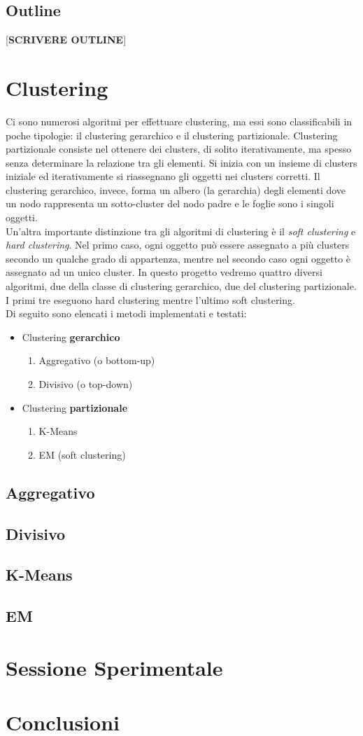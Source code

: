 \documentclass[12pt]{llncs}
\newcommand{\acapo}{\vspace{0.5\baselineskip}\\}
\begin{document}
	\subsection{Outline}
	[\textbf{SCRIVERE OUTLINE}]
	\section{Clustering}
	Ci sono numerosi algoritmi per effettuare clustering, ma essi sono classificabili in poche tipologie: il clustering gerarchico e il clustering partizionale.
	Clustering partizionale consiste nel ottenere dei clusters, di solito iterativamente, ma spesso senza determinare la relazione tra gli elementi. Si inizia con un insieme di clusters iniziale ed iterativamente
	si riassegnano gli oggetti nei clusters corretti. Il clustering gerarchico, invece, forma un albero (la gerarchia) degli elementi dove un nodo rappresenta un sotto-cluster del nodo padre e le foglie sono i singoli
	oggetti.
	\acapo
	Un'altra importante distinzione tra gli algoritmi di clustering è il \textit{soft clustering} e \textit{hard clustering}. Nel primo caso, ogni oggetto può essere assegnato a più clusters secondo un qualche
	grado di appartenza, mentre nel secondo caso ogni oggetto è assegnato ad un unico cluster. In questo progetto vedremo quattro diversi algoritmi, due della classe di clustering gerarchico, due del clustering partizionale.
	I primi tre eseguono hard clustering mentre l'ultimo soft clustering.
	\acapo
	Di seguito sono elencati i metodi implementati e testati:
	\begin{itemize}
		\item Clustering \textbf{gerarchico}
		\begin{enumerate}
			\item Aggregativo (o bottom-up)
			\item Divisivo (o top-down)
		\end{enumerate}

		\item Clustering \textbf{partizionale}
		\begin{enumerate}
			\item K-Means
			\item EM (soft clustering)
		\end{enumerate}
	\end{itemize}
	
	\subsection{Aggregativo}
	\subsection{Divisivo}
	\subsection{K-Means}
	\subsection{EM}
    \section{Sessione Sperimentale}
    \section{Conclusioni}
    
\end{document}
